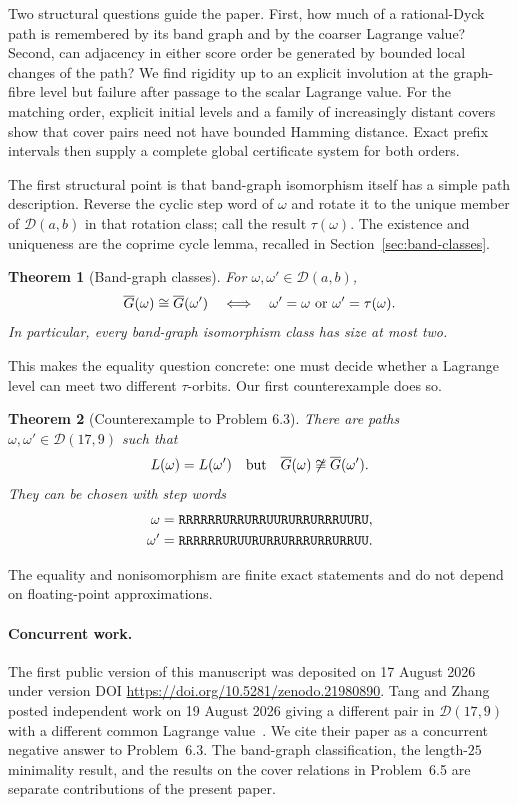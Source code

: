 \documentclass[11pt]{amsart}
\newtheorem{theorem}{Theorem}[section]
\theoremstyle{definition}
\newcommand{\cD}{\mathcal D}
\begin{document}
Two structural questions guide the paper.  First, how much of a rational-Dyck
path is remembered by its band graph and by the coarser Lagrange value?
Second, can adjacency in either score order be generated by bounded local
changes of the path?  We find rigidity up to an explicit involution at the
graph-fibre level but failure after passage to the scalar Lagrange value.  For
the matching order, explicit initial levels and a family of increasingly
distant covers show that cover pairs need not have bounded Hamming distance.
Exact prefix intervals then supply
a complete global certificate system for both orders.

The first structural point is that band-graph isomorphism itself has a simple
path description.  Reverse the cyclic step word of $\omega$ and rotate it to
the unique member of $\cD(a,b)$ in that rotation class; call the result
$\tau(\omega)$.  The existence and uniqueness are the coprime cycle lemma,
recalled in Section~\ref{sec:band-classes}.

\begin{theorem}[Band-graph classes]\label{thm:band-classes}
For $\omega,\omega'\in\cD(a,b)$,
\[
 \overline G(\omega)\cong\overline G(\omega')
 \quad\Longleftrightarrow\quad
 \omega'=\omega\ \hbox{or}\ \omega'=\tau(\omega).
\]
In particular, every band-graph isomorphism class has size at most two.
\end{theorem}

This makes the equality question concrete: one must decide whether a Lagrange
level can meet two different $\tau$-orbits.  Our first counterexample does so.

\begin{theorem}[Counterexample to Problem 6.3]\label{thm:counterexample}
There are paths $\omega,\omega'\in\cD(17,9)$ such that
\[
 L(\omega)=L(\omega')
 \quad\hbox{but}\quad
 \overline G(\omega)\not\cong\overline G(\omega').
\]
They can be chosen with step words
\begin{align*}
 \omega  &={\tt RRRRRRURRURRUURURRURRRUURU},\\
 \omega' &={\tt RRRRRRURUURURRURRRURRURRUU}.
\end{align*}
\end{theorem}

The equality and nonisomorphism are finite exact statements and do not depend
on floating-point approximations.

\paragraph{Concurrent work.}
The first public version of this manuscript was deposited on 17 August 2026
under version DOI \url{https://doi.org/10.5281/zenodo.21980890}.  Tang and
Zhang posted independent work on 19 August 2026 giving a different pair in
$\cD(17,9)$ with a different common Lagrange value~\cite{TangZhang}.  We cite
their paper as a concurrent negative answer to Problem~6.3.  The band-graph
classification, the length-$25$ minimality result, and the results on the
cover relations in Problem~6.5 are separate contributions of the present
paper.
\end{document}
